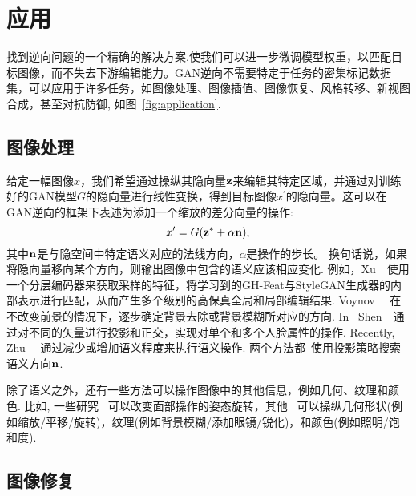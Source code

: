 \section{应用}
\label{sec:applications}

找到逆向问题的一个精确的解决方案,使我们可以进一步微调模型权重，以匹配目标图像，而不失去下游编辑能力。GAN逆向不需要特定于任务的密集标记数据集，可以应用于许多任务，如图像处理、图像插值、图像恢复、风格转移、新视图合成，甚至对抗防御, 如图~\ref{fig:application}.

\subsection{图像处理}
\label{sec:manipulation}

给定一幅图像$x$，我们希望通过操纵其隐向量$\mathbf{z}$来编辑其特定区域，并通过对训练好的GAN模型$G$的隐向量进行线性变换，得到目标图像${x^{\prime}}$的隐向量。这可以在GAN逆向的框架下表述为添加一个缩放的差分向量的操作:
\begin{equation}
x^{\prime}=G(\mathbf{z}^{*}+\alpha \mathbf{n}), 
\end{equation}
其中$\mathbf{n}$是与隐空间中特定语义对应的法线方向，$\alpha$是操作的步长。
换句话说，如果将隐向量移向某个方向，则输出图像中包含的语义应该相应变化. 
例如，Xu~\etal~\cite{xu2020ghfeat}使用一个分层编码器来获取采样的特征，将学习到的GH-Feat与StyleGAN生成器的内部表示进行匹配，从而产生多个级别的高保真全局和局部编辑结果.
Voynov~\etal~\cite{voynov2020latent} 在不改变前景的情况下，逐步确定背景去除或背景模糊所对应的方向.
In~\cite{shen2020interpreting} Shen~\etal~通过对不同的矢量进行投影和正交，实现对单个和多个人脸属性的操作.
Recently, Zhu~\etal~\cite{zhu2020indomain} 通过减少或增加语义程度来执行语义操作. 
两个方法都~\cite{shen2020interpreting,zhu2020indomain}使用投影策略搜索语义方向$\mathbf{n}$.

除了语义之外，还有一些方法可以操作图像中的其他信息，例如几何、纹理和颜色. 
比如, 一些研究~\cite{abdal2020styleflow,abdal2019image2stylegan} 可以改变面部操作的姿态旋转，其他~\cite{voynov2020latent} 可以操纵几何形状(例如缩放/平移/旋转)，纹理(例如背景模糊/添加眼镜/锐化)，和颜色(例如照明/饱和度).

\figapp

\figcorrect

\subsection{图像修复}
\label{sec:restoration}

